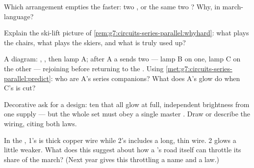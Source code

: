 \begin{exercise}[$\star$]\label{exo:g7:circuits-series-parallel:7}
Which arrangement empties the  faster: two  , or the same two ? Why, in march-language?
\end{exercise}

\begin{exercise}[$\star$]\label{exo:g7:circuits-series-parallel:8}
Explain the ski-lift picture of
\cref{rem:g7:circuits-series-parallel:whyhard}: what plays the
chairs, what plays the skiers, and what is truly used up?
\end{exercise}

\begin{exercise}[$\star\star$]\label{exo:g7:circuits-series-parallel:9}
A diagram: , , then lamp A; after A a 
sends two  --- lamp B on one, lamp C on the other ---
rejoining before returning to the . Using
\cref{met:g7:circuits-series-parallel:predict}: who are A's
series companions? What does A's glow do when C's  is cut?
\end{exercise}

\begin{exercise}[$\star\star$]\label{exo:g7:circuits-series-parallel:10}
Decorative  ask for a design: ten  that all glow at
full, independent brightness from one supply --- but the whole
set must obey a single master . Draw or describe the
wiring, citing both laws.
\end{exercise}

\begin{exercise}[$\star\star$]\label{exo:g7:circuits-series-parallel:11}
In the  ,  1's  is thick
copper wire while  2's  includes a long, thin wire.
 2 glows a little weaker. What does this suggest about how a
's road itself can throttle its share of the march? (Next
year gives this throttling a name and a law.)
\end{exercise}

